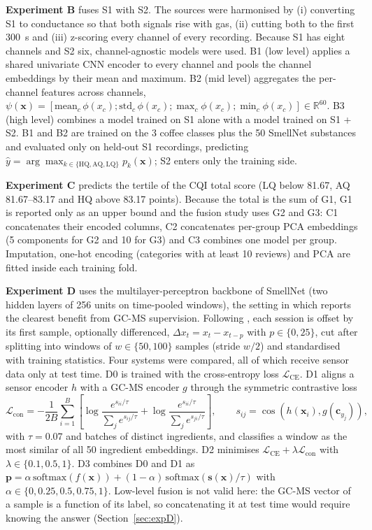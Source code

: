 \documentclass[12pt]{article}
\begin{document}
\textbf{Experiment B} fuses S1 with S2. The sources were harmonised by (i) converting S1 to conductance so that both signals rise with gas, (ii) cutting both to the first 300~s and (iii) z-scoring every channel of every recording. Because S1 has eight channels and S2 six, channel-agnostic models were used. B1 (low level) applies a shared univariate CNN encoder to every channel and pools the channel embeddings by their mean and maximum. B2 (mid level) aggregates the per-channel features across channels, $\psi(\mathbf{x}) = [\mathrm{mean}_c\,\phi(x_c); \mathrm{std}_c\,\phi(x_c); \max_c \phi(x_c); \min_c \phi(x_c)] \in \mathbb{R}^{60}$. B3 (high level) combines a model trained on S1 alone with a model trained on S1 + S2. B1 and B2 are trained on the 3 coffee classes plus the 50 SmellNet substances and evaluated only on held-out S1 recordings, predicting $\hat{y} = \arg\max_{k \in \{\mathrm{HQ}, \mathrm{AQ}, \mathrm{LQ}\}} p_k(\mathbf{x})$; S2 enters only the training side.

\textbf{Experiment C} predicts the tertile of the CQI total score (LQ below 81.67, AQ 81.67--83.17 and HQ above 83.17 points). Because the total is the sum of G1, G1 is reported only as an upper bound and the fusion study uses G2 and G3: C1 concatenates their encoded columns, C2 concatenates per-group PCA embeddings (5 components for G2 and 10 for G3) and C3 combines one model per group. Imputation, one-hot encoding (categories with at least 10 reviews) and PCA are fitted inside each training fold.

\textbf{Experiment D} uses the multilayer-perceptron backbone of SmellNet (two hidden layers of 256 units on time-pooled windows), the setting in which \cite{feng2026smellnet} reports the clearest benefit from GC-MS supervision. Following \cite{feng2026smellnet}, each session is offset by its first sample, optionally differenced, $\Delta x_t = x_t - x_{t-p}$ with $p \in \{0, 25\}$, cut after splitting into windows of $w \in \{50, 100\}$ samples (stride $w/2$) and standardised with training statistics. Four systems were compared, all of which receive sensor data only at test time. D0 is trained with the cross-entropy loss $\mathcal{L}_{\mathrm{CE}}$. D1 aligns a sensor encoder $h$ with a GC-MS encoder $g$ through the symmetric contrastive loss
\begin{equation}
\mathcal{L}_{\mathrm{con}} = -\frac{1}{2B} \sum_{i=1}^{B} \left[ \log \frac{e^{s_{ii}/\tau}}{\sum_{j} e^{s_{ij}/\tau}} + \log \frac{e^{s_{ii}/\tau}}{\sum_{j} e^{s_{ji}/\tau}} \right], \qquad s_{ij} = \cos\left(h(\mathbf{x}_i), g(\mathbf{c}_{y_j})\right),
\end{equation}
with $\tau = 0.07$ and batches of distinct ingredients, and classifies a window as the most similar of all 50 ingredient embeddings. D2 minimises $\mathcal{L}_{\mathrm{CE}} + \lambda \mathcal{L}_{\mathrm{con}}$ with $\lambda \in \{0.1, 0.5, 1\}$. D3 combines D0 and D1 as $\mathbf{p} = \alpha\,\mathrm{softmax}(f(\mathbf{x})) + (1-\alpha)\,\mathrm{softmax}(\mathbf{s}(\mathbf{x})/\tau)$ with $\alpha \in \{0, 0.25, 0.5, 0.75, 1\}$. Low-level fusion is not valid here: the GC-MS vector of a sample is a function of its label, so concatenating it at test time would require knowing the answer (Section~\ref{sec:expD}).
\end{document}
